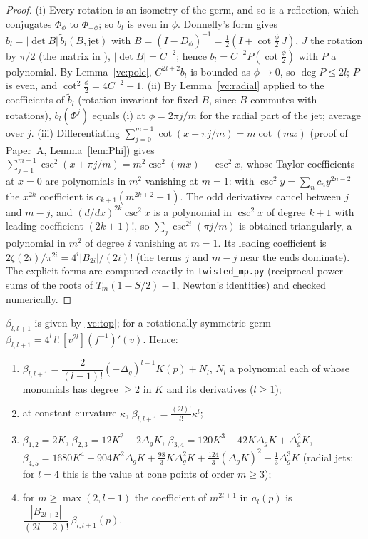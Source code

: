 \begin{proof}
(i) Every rotation is an isometry of the germ, and so is a reflection, which conjugates $\Phi_\phi$ to
$\Phi_{-\phi}$; so $b_l$ is even in $\phi$. Donnelly's form \cite[4.2]{dggw2008} gives
$b_l=|\det B|\,\tilde b_l(B,\text{jet})$ with $B=(I-D_\phi)^{-1}=\frac12(I+\cot\frac\phi2\,J)$, $J$ the rotation by
$\pi/2$ (the matrix in \cite[5.6]{dggw2008}), $|\det B|=C^{-2}$; hence $b_l=C^{-2}P(\cot\frac\phi2)$ with $P$
a polynomial. By Lemma~\ref{vc:pole}, $C^{2l+2}b_l$ is bounded as $\phi\to0$, so $\deg P\le2l$; $P$ is even,
and $\cot^2\frac\phi2=4C^{-2}-1$. (ii) By Lemma~\ref{vc:radial} applied to the coefficients of $\tilde b_l$
(rotation invariant for fixed $B$, since $B$ commutes with rotations), $b_l(\Phi^j)$ equals (i) at
$\phi=2\pi j/m$ for the radial part of the jet; average over $j$. (iii) Differentiating
$\sum_{j=0}^{m-1}\cot(x+\pi j/m)=m\cot(mx)$ (proof of Paper~A, Lemma~\ref{lem:Phi}) gives
$\sum_{j=1}^{m-1}\csc^2(x+\pi j/m)=m^2\csc^2(mx)-\csc^2x$, whose Taylor coefficients at $x=0$ are
polynomials in $m^2$ vanishing at $m=1$: with $\csc^2y=\sum_nc_ny^{2n-2}$ the $x^{2k}$ coefficient is
$c_{k+1}(m^{2k+2}-1)$. The odd derivatives cancel between $j$ and $m-j$, and
$(d/dx)^{2k}\csc^2x$ is a polynomial in $\csc^2x$ of degree $k+1$ with leading coefficient $(2k+1)!$, so
$\sum_j\csc^{2i}(\pi j/m)$ is obtained triangularly, a polynomial in $m^2$ of degree $i$ vanishing at $m=1$. Its leading coefficient is $2\zeta(2i)/\pi^{2i}=4^i|B_{2i}|/(2i)!$ (the terms $j$ and $m-j$
near the ends dominate). The explicit forms are computed exactly in \texttt{twisted\_mp.py} (reciprocal
power sums of the roots of $T_m(1-S/2)-1$, Newton's identities) and checked numerically.
\end{proof}

\begin{theorem}\label{vc:VC2}
$\beta_{l,l+1}$ is given by \eqref{vc:top}; for a rotationally symmetric germ
$\beta_{l,l+1}=4^l\,l!\,[v^{2l}](f^{-1})'(v)$. Hence:
\begin{enumerate}[label=(\roman*)]
\item $\beta_{l,l+1}=\dfrac{2}{(l-1)!}(-\Delta_g)^{l-1}K(p)+N_l$, $N_l$ a polynomial each of whose monomials
has degree $\ge2$ in $K$ and its derivatives ($l\ge1$);
\item at constant curvature $\kappa$, $\beta_{l,l+1}=\frac{(2l)!}{l!}\kappa^l$;
\item $\beta_{1,2}=2K$, $\beta_{2,3}=12K^2-2\Delta_gK$, $\beta_{3,4}=120K^3-42K\Delta_gK+\Delta_g^2K$,
$\beta_{4,5}=1680K^4-904K^2\Delta_gK+\frac{98}3K\Delta_g^2K+\frac{124}3(\Delta_gK)^2-\frac13\Delta_g^3K$
(radial jets; for $l=4$ this is the value at cone points of order $m\ge3$);
\item for $m\ge\max(2,l-1)$ the coefficient of $m^{2l+1}$ in $a_l(p)$ is
$\dfrac{|B_{2l+2}|}{(2l+2)!}\,\beta_{l,l+1}(p)$.
\end{enumerate}
\end{theorem}

